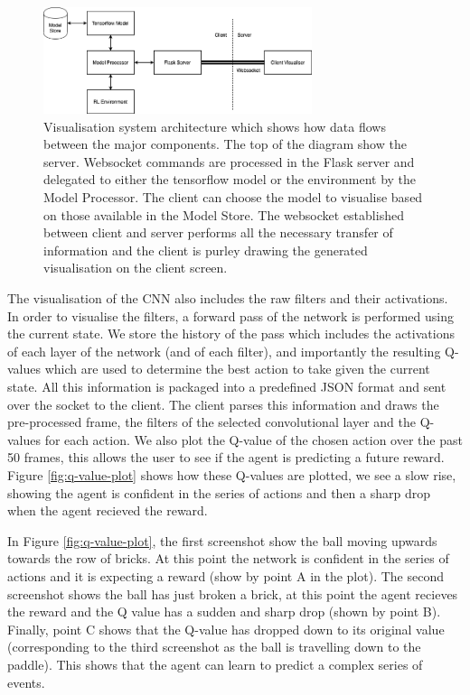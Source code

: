 \begin{figure}[htbp]
	\centering
	\includegraphics[width=0.70\textwidth]{chapters/chapter4/images/VizSystem.png}
	\caption[Visualisation system architecture]{Visualisation system architecture which shows how data flows between the major components. The top of the diagram show the server. Websocket commands are processed in the Flask server and delegated to either the tensorflow model or the environment by the Model Processor. The client can choose the model to visualise based on those available in the Model Store. The websocket established between client and server performs all the necessary transfer of information and the client is purley drawing the generated visualisation on the client screen.
		\label{fig:viz-system-arch}
	}
\end{figure}


The visualisation of the CNN also includes the raw filters and their activations. In order to visualise the filters, a forward pass of the network is performed using the current state. We store the history of the pass which includes the activations of each layer of the network (and of each filter), and importantly the resulting Q-values which are used to determine the best action to take given the current state. All this information is packaged into a predefined JSON format and sent over the socket to the client. The client parses this information and draws the pre-processed frame, the filters of the selected convolutional layer and the Q-values for each action. We also plot the Q-value of the chosen action over the past 50 frames, this allows the user to see if the agent is predicting a future reward. Figure \ref{fig:q-value-plot} shows how these Q-values are plotted, we see a slow rise, showing the agent is confident in the series of actions and then a sharp drop when the agent recieved the reward.

In Figure \ref{fig:q-value-plot}, the first screenshot show the ball moving upwards towards the row of bricks. At this point the network is confident in the series of actions and it is expecting a reward (show by point A in the plot). The second screenshot shows the ball has just broken a brick, at this point the agent recieves the reward and the Q value has a sudden and sharp drop (shown by point B). Finally, point C shows that the Q-value has dropped down to its original value (corresponding to the third screenshot as the ball is travelling down to the paddle). This shows that the agent can learn to predict a complex series of events.


